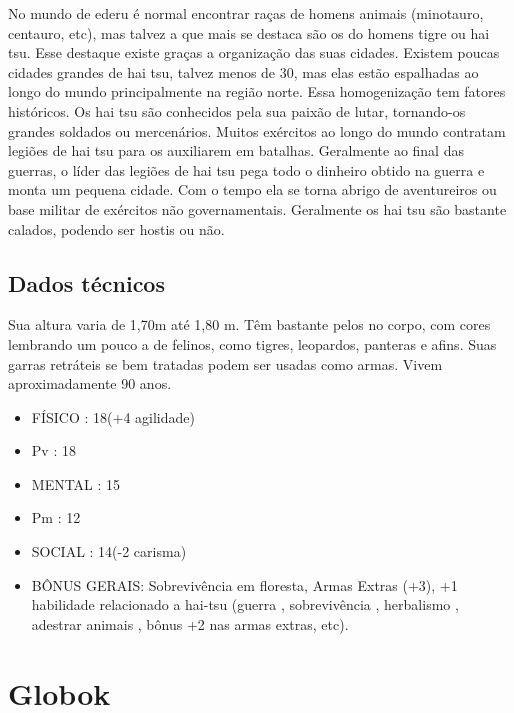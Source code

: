 No mundo de ederu é normal encontrar raças de homens animais (minotauro, centauro, etc), mas talvez a que mais se destaca são os do homens tigre ou hai tsu. Esse destaque existe graças a organização das suas cidades. Existem poucas cidades grandes de hai tsu, talvez menos de 30, mas elas estão espalhadas ao longo do mundo principalmente na região norte. Essa homogenização tem fatores históricos. Os hai tsu são conhecidos pela sua paixão de lutar, tornando-os grandes soldados ou mercenários. Muitos exércitos ao longo do mundo contratam legiões de hai tsu para os auxiliarem em batalhas. Geralmente ao final das guerras, o líder das legiões de hai tsu pega todo o dinheiro obtido na guerra e monta um pequena cidade. Com o tempo ela se torna abrigo de aventureiros ou base militar de exércitos não governamentais. Geralmente os hai tsu são bastante calados, podendo ser hostis ou não. 

\subsection{Dados técnicos}


Sua altura varia de 1,70m até 1,80 m. Têm bastante pelos no corpo, com cores lembrando um pouco a de felinos, como tigres, leopardos, panteras e afins. Suas garras retráteis se bem tratadas podem ser usadas como armas. Vivem aproximadamente 90 anos. 


\begin{itemize}


\item FÍSICO : 18(+4 agilidade)
\item Pv : 18 

\item MENTAL : 15
\item Pm : 12

\item SOCIAL : 14(-2 carisma)

\item BÔNUS GERAIS: Sobrevivência em floresta, Armas Extras (+3), +1 habilidade relacionado a hai-tsu (guerra , sobrevivência , herbalismo , adestrar animais , bônus +2 nas armas extras, etc). 


\end{itemize}



\section{Globok}

